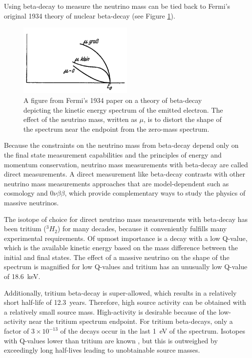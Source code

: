 Using beta-decay to measure the neutrino mass can be tied back to Fermi's original 1934 theory of nuclear beta-decay \cite{fermi_beta_decay} (see Figure \ref{fig:chap2-fermi-original-b-spectrum}).
\begin{figure}[htbp]
    \centering
    \includegraphics[width=0.5\textwidth]{figs/Chapter-2/Fermi.png}
    \caption{A figure from Fermi's 1934 paper on a theory of beta-decay depicting the kinetic energy spectrum of the emitted electron. The effect of the neutrino mass, written as $\mu$, is to distort the shape of the spectrum near the endpoint from the zero-mass spectrum.}
    \label{fig:chap2-fermi-original-b-spectrum}
\end{figure}
Because the constraints on the neutrino mass from beta-decay depend only on the final state measurement capabilities and the principles of energy and momentum conservation, neutrino mass measurements with beta-decay are called direct measurements. A direct measurement like beta-decay contrasts with other neutrino mass measurements approaches that are model-dependent such as cosmology and $0\nu\beta\beta$, which provide complementary ways to study the physics of massive neutrinos.

The isotope of choice for direct neutrino mass measurements with beta-decay has been tritium ($^3H_2$) for many decades, because it conveniently fulfills many experimental requirements. Of upmost importance is a decay with a low Q-value, which is the available kinetic energy based on the mass difference between the initial and final states. The effect of a massive neutrino on the shape of the spectrum is magnified for low Q-values and tritium has an unusually low Q-value of 18.6~keV.

Additionally, tritium beta-decay is super-allowed, which results in a relatively short half-life of 12.3~years. Therefore, high source activity can be obtained with a relatively small source mass. High-activity is desirable because of the low-activity near the tritium spectrum endpoint. For tritium beta-decays, only a factor of $3\times10^{-13}$ of the decays occur in the last 1~eV of the spectrum. Isotopes with Q-values lower than tritium are known \cite{FORMAGGIO20211}, but this is outweighed by exceedingly long half-lives leading to unobtainable source masses.

